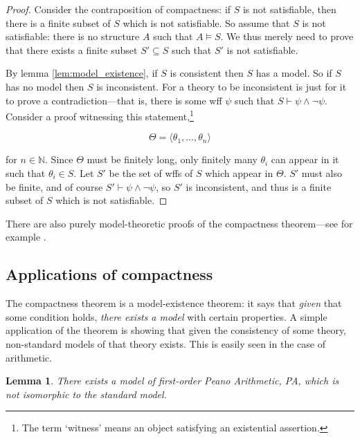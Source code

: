 \documentclass[10pt, a4paper, oneside]{article}
\theoremstyle{definition}
\theoremstyle{remark}
\theoremstyle{plain}
\newtheorem{lem}[thm]{Lemma}
\theoremstyle{plain}
\begin{document}
\begin{proof}
    Consider the contraposition of compactness: if $S$ is not satisfiable, then
    there is a finite subset of $S$ which is not satisfiable. So assume that $S$
    is not satisfiable: there is no structure $A$ such that $A \models S$. We
    thus merely need to prove that there exists a finite subset $S' \subseteq S$
    such that $S'$ is not satisfiable.
    
    By lemma \ref{lem:model_existence}, if $S$ is consistent then $S$ has a
    model. So if $S$ has no model then $S$ is inconsistent. For a theory to be
    inconsistent is just for it to prove a contradiction---that is, there is
    some wff $\psi$ such that $S \vdash \psi \wedge \neg\psi$. Consider a proof
    witnessing this statement,\footnote{The term `witness' means an object
    satisfying an existential assertion.}
    
    \begin{displaymath}
        \Theta = \langle \theta_1, \dotsc, \theta_n \rangle
    \end{displaymath}
    
    for $n \in \mathbb{N}$. Since $\Theta$ must be finitely long, only finitely
    many $\theta_i$ can appear in it such that $\theta_i \in S$. Let $S'$ be the
    set of wffs of $S$ which appear in $\Theta$. $S'$ must also be finite, and
    of course $S' \vdash \psi \wedge \neg\psi$, so $S'$ is inconsistent, and
    thus is a finite subset of $S$ which is not satisfiable.
\end{proof}

There are also purely model-theoretic proofs of the compactness theorem---see
for example \citealt[pp. 125--127]{hodges1997}.

\subsection{Applications of compactness}

The compactness theorem is a model-existence theorem: it says that \emph{given}
that some condition holds, \emph{there exists a model} with certain properties.
A simple application of the theorem is showing that given the consistency of
some theory, non-standard models of that theory exists. This is easily seen in
the case of arithmetic.

\begin{lem}
    There exists a model of first-order Peano Arithmetic, PA, which is not
    isomorphic to the standard model.
\end{lem}
\end{document}
